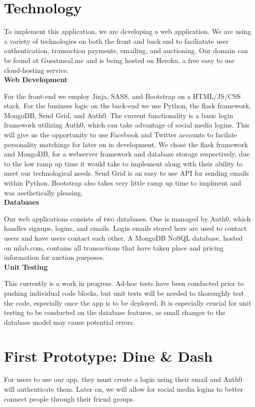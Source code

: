 \documentclass[column,12pt]{article}
\begin{document}
\section{Technology}
To implement this application, we are developing a web application. We are using a variety of technologies on both the front and back end to faciliatate user authentication, transaction payments, emailing, and auctioning. Our domain can be found at Guestmeal.me and is being hosted on Heroku, a free easy to use cloud-hosting service. \\

\textbf{Web Development}

For the front-end we employ Jinja, SASS, and Bootstrap on a HTML/JS/CSS stack. For the business logic on the back-end we use Python, the flask framework, MongoDB, Send Grid, and Auth0. The current functionality is a basic login framework utilizing Auth0, which can take advantage of social media logins. This will give us the opportunity to use  Facebook and Twitter accounts to facilate personality matchings for later on in development. We chose the flask framework and MongoDB, for
a webserver framework and database storage respectively, due to the low ramp up time it would take to implement along with their ability to meet our technological needs. Send Grid is an easy to use API for sending emails within Python. Bootstrap also takes very little ramp up time to implment and was aesthetically pleasing.\\

\textbf{Databases}

Our web applications consists of two databases. One is managed by Auth0, which handles signups, logins, and emails. Login emails stored here are used to contact users and have users contact each other. A MongoDB NoSQL database, hosted on mlab.com, contains all transactions that have taken place and pricing information for auction purposes. \\

\textbf{Unit Testing}

This currently is a work in progress. Ad-hoc tests have been conducted prior to pushing individual code blocks, but unit tests will be needed to thoroughly test the code, especially once the app is to be deployed. It is especially crucial for unit testing to be conducted on the database features, as small changes to the database model may cause potential errors. \\

\section{First Prototype: Dine \& Dash}
For users to use our app, they must create a login using their email and Auth0 will authenticate them. Later on, we will allow for social media logins to better connect people through their friend groups. 
\end{document}
